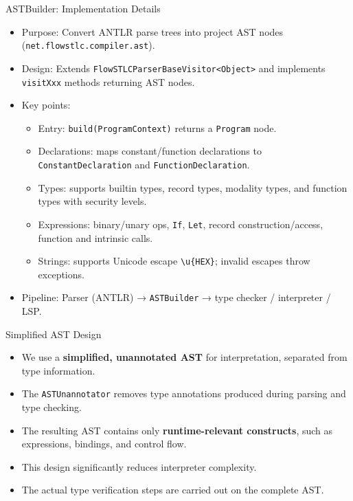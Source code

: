 \documentclass{beamer}
\begin{document}

\begin{frame}{ASTBuilder: Implementation Details}
    \begin{itemize}
        \item Purpose: Convert ANTLR parse trees into project AST nodes (\texttt{net.flowstlc.compiler.ast}).
        \item Design: Extends \texttt{FlowSTLCParserBaseVisitor<Object>} and implements \texttt{visitXxx} methods returning AST nodes.
        \item Key points:
        \begin{itemize}
            \item Entry: \texttt{build(ProgramContext)} returns a \texttt{Program} node.
            \item Declarations: maps constant/function declarations to \texttt{ConstantDeclaration} and \texttt{FunctionDeclaration}.
            \item Types: supports builtin types, record types, modality types, and function types with security levels.
            \item Expressions: binary/unary ops, \texttt{If}, \texttt{Let}, record construction/access, function and intrinsic calls.
            \item Strings: supports Unicode escape \texttt{\textbackslash u\{HEX\}}; invalid escapes throw exceptions.
        \end{itemize}
        \item Pipeline: Parser (ANTLR) → \texttt{ASTBuilder} → type checker / interpreter / LSP.
    \end{itemize}
\end{frame}

\begin{frame}{Simplified AST Design}
\begin{itemize}
    \item We use a \textbf{simplified, unannotated AST} for interpretation, separated from type information.
    \item The \texttt{ASTUnannotator} removes type annotations produced during parsing and type checking.
    \item The resulting AST contains only \textbf{runtime-relevant constructs}, such as expressions, bindings, and control flow.
    \item This design significantly reduces interpreter complexity.
    \item The actual type verification steps are carried out on the complete AST.
\end{itemize}
\end{frame}
\end{document}

